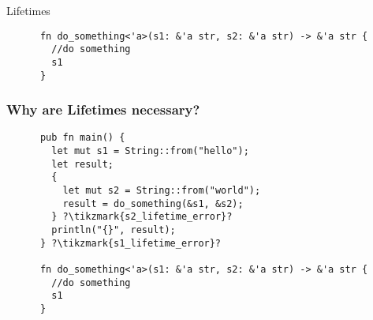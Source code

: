 \begin{section}{Lifetimes}
\begin{frame}[fragile]
\begin{verbatim}
      fn do_something<'a>(s1: &'a str, s2: &'a str) -> &'a str {
        //do something
        s1
      }
    \end{verbatim}
  \end{frame}

  \begin{frame}[fragile]
    \frametitle{Why are Lifetimes necessary?}
    \begin{verbatim}
      pub fn main() {
        let mut s1 = String::from("hello");
        let result;
        {
          let mut s2 = String::from("world");
          result = do_something(&s1, &s2);
        } ?\tikzmark{s2_lifetime_error}?
        println("{}", result);
      } ?\tikzmark{s1_lifetime_error}?

      fn do_something<'a>(s1: &'a str, s2: &'a str) -> &'a str {
        //do something
        s1
      }
    \end{verbatim}
  \end{frame}

\end{section}
